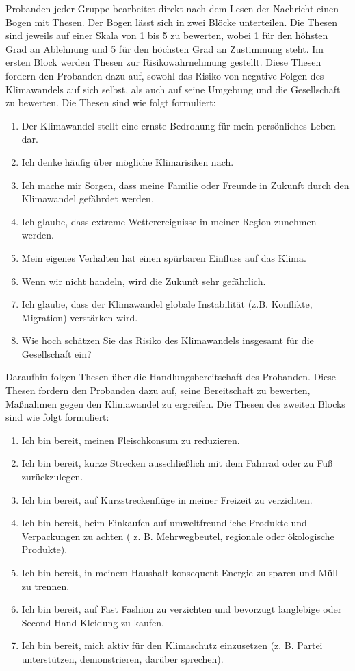 \documentclass[12pt,twoside=off,
bibtotoc,liststotoc,appendixprefix,paper=a4,headings=small]{scrbook} %
\begin{document}
Probanden jeder Gruppe bearbeitet direkt nach dem Lesen der Nachricht einen Bogen mit Thesen. Der Bogen lässt sich in zwei Blöcke unterteilen. Die Thesen sind jeweils auf einer Skala von 1 bis 5 zu bewerten, wobei 1 für den höhsten Grad an Ablehnung und 5 für den höchsten Grad an Zustimmung steht.
Im ersten Block werden Thesen zur Risikowahrnehmung gestellt. Diese Thesen fordern den Probanden dazu auf, sowohl das Risiko von negative Folgen des Klimawandels auf sich selbst, als auch auf seine Umgebung und die Gesellschaft zu bewerten. Die Thesen sind wie folgt formuliert:

\begin{enumerate}
  \item Der Klimawandel stellt eine ernste Bedrohung für mein persönliches Leben dar.
  \item Ich denke häufig über mögliche Klimarisiken nach.
  \item Ich mache mir Sorgen, dass meine Familie oder Freunde in Zukunft durch den Klimawandel gefährdet werden.
  \item Ich glaube, dass extreme Wetterereignisse in meiner Region zunehmen werden.
  \item Mein eigenes Verhalten hat einen spürbaren Einfluss auf das Klima.
  \item Wenn wir nicht handeln, wird die Zukunft sehr gefährlich.
  \item Ich glaube, dass der Klimawandel globale Instabilität (z.B. Konflikte, Migration) verstärken wird.
  \item Wie hoch schätzen Sie das Risiko des Klimawandels insgesamt für die Gesellschaft ein?
\end{enumerate}

Daraufhin folgen Thesen über die Handlungsbereitschaft des Probanden. Diese Thesen fordern den Probanden dazu auf, seine Bereitschaft zu bewerten, Maßnahmen gegen den Klimawandel zu ergreifen. Die Thesen des zweiten Blocks sind wie folgt formuliert:
\begin{enumerate}
  \item Ich bin bereit, meinen Fleischkonsum zu reduzieren.
  \item Ich bin bereit, kurze Strecken ausschließlich mit dem Fahrrad oder zu Fuß zurückzulegen.
  \item Ich bin bereit, auf Kurzstreckenflüge in meiner Freizeit zu verzichten.
  \item Ich bin bereit, beim Einkaufen auf umweltfreundliche Produkte und Verpackungen zu achten ( z. B. Mehrwegbeutel, regionale oder ökologische Produkte).
  \item Ich bin bereit, in meinem Haushalt konsequent Energie zu sparen und Müll zu trennen.
  \item Ich bin bereit, auf Fast Fashion zu verzichten und bevorzugt langlebige oder Second-Hand Kleidung zu kaufen.
  \item Ich bin bereit, mich aktiv für den Klimaschutz einzusetzen (z. B. Partei unterstützen, demonstrieren, darüber sprechen).
\end{enumerate}
\end{document}
